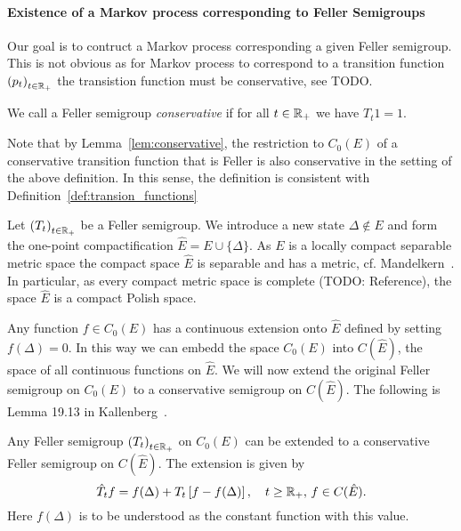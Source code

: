 \documentclass[../Master.tex]{subfiles}
\begin{document}
\paragraph{Existence of a Markov process corresponding to Feller Semigroups}
Our goal is to contruct a Markov process corresponding a given Feller semigroup. This is not obvious as for Markov process to correspond to a transition function \({(p_t)}_{t \in \mathbb{R}_+}\) the transistion function must be conservative, see TODO.

\begin{definition}
  We call a Feller semigroup \emph{conservative} if for all \(t \in \mathbb{R}_+\) we have \(T_t 1 = 1\).
\end{definition}
Note that by Lemma~\ref{lem:conservative}, the restriction to \(C_0(E)\) of a conservative transition function that is Feller is also conservative in the setting of the above definition. In this sense, the definition is consistent with Definition~\ref{def:transion_functions}

Let \({(T_t)}_{t \in \mathbb{R}_+}\) be a Feller semigroup. We introduce a new state \(\Delta \notin E\) and form the one-point compactification \(\hat{E} = E \cup \{ \Delta \} \). As \(E\) is a locally compact separable metric space the compact space \(\hat{E}\) is separable and has a metric, cf. Mandelkern~\cite[Theorem 2]{mandelkern_metrization_1989}. In particular, as every compact metric space is complete (TODO: Reference), the space \(\hat{E}\) is a compact Polish space.

Any function \(f \in C_0(E)\) has a continuous extension onto \(\hat{E}\) defined by setting \(f(\Delta) = 0\). In this way we can embedd the space \(C_0(E)\) into \(C(\hat{E})\), the space of all continuous functions on \(\hat{E}\). We will now extend the original Feller semigroup on \(C_0(E)\) to a conservative semigroup on \(C(\hat{E})\). The following is Lemma 19.13 in Kallenberg~\cite{kallenberg_foundations_2002}.

\begin{lemma}[Compactification]
  Any Feller semigroup \({(T_t)}_{t \in \mathbb{R}_+}\) on \(C_0(E)\) can be extended to a conservative Feller semigroup on \(C(\hat{E})\). The extension is given by
  \begin{equation*}
    \hat{T}_t f = f(\Delta) + T_t \left[f - f(\Delta)\right], \quad t \ge \mathbb{R}_+, \, f \in C(\hat{E}).
  \end{equation*}
  Here \(f(\Delta)\) is to be understood as the constant function with this value.
\end{lemma}
\end{document}
